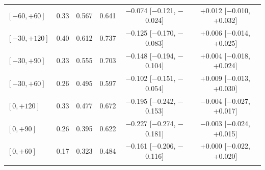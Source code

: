 \begin{table}[tbp]
\begin{tabular*}{\textwidth}{@{\extracolsep\fill}lccccc}
$[{-}60,+60]$ & 0.33 & 0.567 & 0.641 & $-$0.074 [$-$0.121, $-$0.024] & +0.012 [$-$0.010, +0.032] \\
$[{-}30,+120]$ & 0.40 & 0.612 & 0.737 & $-$0.125 [$-$0.170, $-$0.083] & +0.006 [$-$0.014, +0.025] \\
$[{-}30,+90]$ & 0.33 & 0.555 & 0.703 & $-$0.148 [$-$0.194, $-$0.104] & +0.004 [$-$0.018, +0.024] \\
$[{-}30,+60]$ & 0.26 & 0.495 & 0.597 & $-$0.102 [$-$0.151, $-$0.054] & +0.009 [$-$0.013, +0.030] \\
$[0,+120]$ & 0.33 & 0.477 & 0.672 & $-$0.195 [$-$0.242, $-$0.153] & $-$0.004 [$-$0.027, +0.017] \\
$[0,+90]$ & 0.26 & 0.395 & 0.622 & $-$0.227 [$-$0.274, $-$0.181] & $-$0.003 [$-$0.024, +0.015] \\
$[0,+60]$ & 0.17 & 0.323 & 0.484 & $-$0.161 [$-$0.206, $-$0.116] & +0.000 [$-$0.022, +0.020] \\
\botrule
\end{tabular*}
\end{table}

